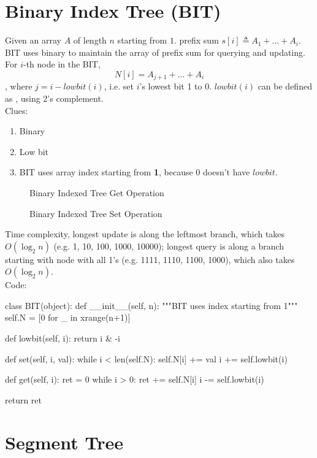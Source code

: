 \section{Binary Index Tree (BIT)}\label{BIT}
Given an array $A$ of length $n $ starting from $1$. prefix sum $s[i]\triangleq A_1+...+A_i$. BIT uses binary to maintain the array of prefix sum for querying and updating. For $i$-th node in the BIT, 
$$
N[i]=A_{j+1}+...+A_i
$$
, where $j=i-lowbit(i)$, i.e. set $i$'s lowest bit 1 to 0. $lowbit(i)$ can be defined as , using 2's complement. 
\\
Clues:
\begin{enumerate}
\item Binary 
\item Low bit
\item BIT uses array index starting from \textbf{1}, because 0 doesn't have $lowbit$.
\end{enumerate}
\begin{figure}[hbtp]
\centering
{}
\caption{Binary Indexed Tree Get Operation}
\label{fig:LABEL}
\end{figure}

\begin{figure}[hbtp]
\centering
{}
\caption{Binary Indexed Tree Set Operation}
\label{fig:LABEL}
\end{figure}

Time complexity, longest update is along the leftmost branch, which takes $O(\log_2 n)$ (e.g. 1, 10, 100, 1000, 10000); longest query is along a branch starting with node with all 1's (e.g. 1111, 1110, 1100, 1000), which also takes $O(\log_2 n)$.\\
Code:
\begin{python}
class BIT(object):
    def __init__(self, n):
        """BIT uses index starting from 1"""
        self.N = [0 for _ in xrange(n+1)]

    def lowbit(self, i):
        return i & -i

    def set(self, i, val):
        while i < len(self.N):
            self.N[i] += val
            i += self.lowbit(i)

    def get(self, i):
        ret = 0
        while i > 0:
            ret += self.N[i]
            i -= self.lowbit(i)

        return ret
\end{python}


\section{Segment Tree}

